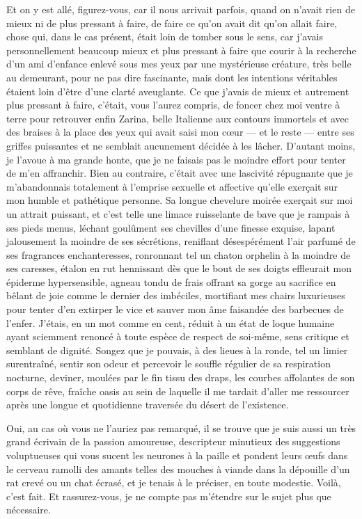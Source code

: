 
\label{rat:42}%
Et on y est allé, figurez-vous, car il nous arrivait parfois, quand on n’avait rien de mieux ni de plus pressant à faire, de faire ce qu’on avait dit qu’on allait faire, chose qui, dans le cas présent, était loin de tomber sous le sens, car j’avais personnellement beaucoup mieux et plus pressant à faire que courir à la recherche d’un ami d’enfance enlevé sous mes yeux par une mystérieuse créature, très belle au demeurant, pour ne pas dire fascinante, mais dont les intentions véritables étaient loin d’être d’une clarté aveuglante. Ce que j’avais de mieux et autrement plus pressant à faire, c’était, vous l’aurez compris, de foncer chez moi ventre à terre pour retrouver enfin Zarina, belle Italienne aux contours immortels et avec des braises à la place des yeux qui avait saisi mon cœur — et le reste — entre ses griffes puissantes et ne semblait aucunement décidée à les lâcher. D’autant moins, je l’avoue à ma grande honte, que je ne faisais pas le moindre effort pour tenter de m’en affranchir. Bien au contraire, c’était avec une lascivité répugnante que je m’abandonnais totalement à l’emprise sexuelle et affective qu’elle exerçait sur mon humble et pathétique personne. Sa longue chevelure moirée exerçait sur moi un attrait puissant, et c’est telle une limace ruisselante de bave que je rampais à ses pieds menus, léchant goulûment ses chevilles d’une finesse exquise, lapant jalousement la moindre de ses sécrétions, reniflant désespérément l’air parfumé de ses fragrances enchanteresses, ronronnant tel un chaton orphelin à la moindre de ses caresses, étalon en rut hennissant dès que le bout de ses doigts effleurait mon épiderme hypersensible, agneau tondu de frais offrant sa gorge au sacrifice en bêlant de joie comme le dernier des imbéciles, mortifiant mes chairs luxurieuses pour tenter d’en extirper le vice et sauver mon âme faisandée des barbecues de l’enfer. J’étais, en un mot comme en cent, réduit à un état de loque humaine ayant sciemment renoncé à toute espèce de respect de soi-même, sens critique et semblant de dignité. Songez que je pouvais, à des lieues à la ronde, tel un limier surentraîné, sentir son odeur et percevoir le souffle régulier de sa respiration nocturne, deviner, moulées par le fin tissu des draps, les courbes affolantes de son corps de rêve, fraîche oasis au sein de laquelle il me tardait d’aller me ressourcer après une longue et quotidienne traversée du désert de l’existence.

\label{rat:39}%
Oui, au cas où vous ne l’auriez pas remarqué, il se trouve que je suis aussi un très grand écrivain de la passion amoureuse, descripteur minutieux des suggestions voluptueuses qui vous sucent les neurones à la paille et pondent leurs œufs dans le cerveau ramolli des amants telles des mouches à viande dans la dépouille d’un rat crevé ou un chat écrasé, et je tenais à le préciser, en toute modestie. Voilà, c’est fait. Et rassurez-vous, je ne compte pas m’étendre sur le sujet plus que nécessaire.

